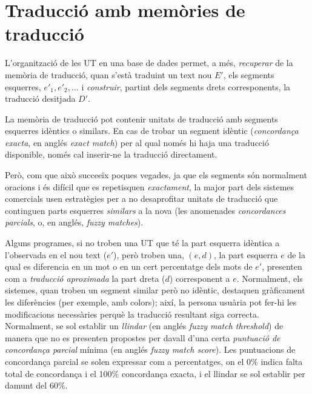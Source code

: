 \section{Traducció amb memòries de traducció}

L'organització de les UT en una base de dades permet, a més,
\emph{recuperar} de la memòria de traducció, quan s'està traduint un
text nou $E'$, els segments esquerres, $e'_1, e'_2, \ldots$ i
\emph{construir}, partint dels segments drets corresponents, la
traducció desitjada $D'$.

La memòria de traducció pot contenir unitats de traducció amb segments
esquerres idèntics o similars. En cas de trobar un segment idèntic
(\emph{concordança exacta}, en anglés \emph{exact match}) per al qual
només hi haja una traducció disponible, només cal inserir-ne la
traducció directament.


Però, com que això succeeïx poques vegades, ja que els segments són
normalment oracions i és difícil que es repetisquen \emph{exactament},
la major part dels sistemes comercials usen estratègies per a no
desaprofitar unitats de traducció que continguen parts esquerres
\emph{similars} a la nova (les anomenades \emph{concordances
  parcials}, o, en anglés, \emph{fuzzy matches}).


Alguns programes, si no troben una UT que té la part esquerra idèntica
a l'observada en el nou text ($e'$), però troben una, $(e,d)$, la part
esquerra $e$ de la qual es diferencia en un mot o en un cert
percentatge dels mots de $e'$, presenten com a \emph{traducció
  aproximada} la part dreta ($d$) corresponent a $e$.  Normalment, els
sistemes, quan troben un segment similar però no idèntic, destaquen
gràficament les diferències (per exemple, amb colors); així, la
persona usuària pot fer-hi les modificacions necessàries perquè la
traducció resultant siga correcta. Normalment, se sol establir un
\emph{llindar} (en anglés \emph{fuzzy match threshold}) de manera que
no es presenten propostes per davall d'una certa \emph{puntuació de
  concordança parcial} mínima (en anglés \emph{fuzzy match
  score}). Les puntuacions de concordança parcial se solen expressar
com a percentatges, on el 0\% indica falta total de concordança i el 100\%
concordança exacta, i el llindar se sol establir per damunt del 60\%.

